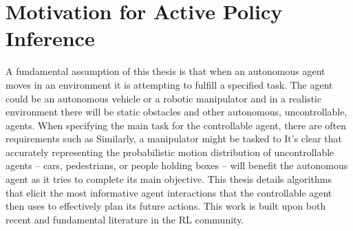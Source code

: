 %
%
\chapter{Motivation for Active Policy Inference}\label{chapt:motivation}

%
%
%
%

    A fundamental assumption of this thesis is that when an autonomous agent moves in an environment it is attempting to
    fulfill a specified task. The agent could be an autonomous vehicle or a robotic manipulator and in a realistic
    environment there will be static obstacles and other autonomous, uncontrollable, agents. When specifying the main
    task for the controllable agent, there are often requirements such as  Similarly, a manipulator might be tasked
    to  It's clear that
    accurately representing the probabilistic motion distribution of uncontrollable agents -- cars, pedestrians, or
    people holding boxes -- will benefit the autonomous agent as it tries to complete its main objective. This thesis
    details algorithms that elicit the most informative agent interactions that the controllable agent then uses to
    effectively plan its future actions. This work is built upon both recent and fundamental literature in the \ac{RL}
    community.


